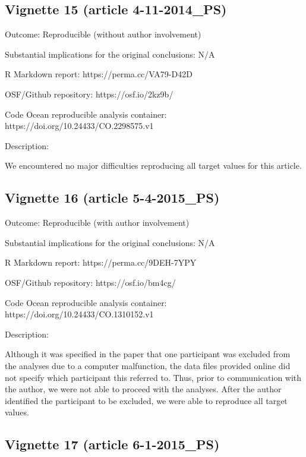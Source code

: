 \begin{appendix}
\hypertarget{vignette-15-article-4-11-2014_ps}{%
\subsection{Vignette 15 (article
4-11-2014\_PS)}\label{vignette-15-article-4-11-2014_ps}}

Outcome: Reproducible (without author involvement)

Substantial implications for the original conclusions: N/A

R Markdown report: https://perma.cc/VA79-D42D

OSF/Github repository: https://osf.io/2kz9b/

Code Ocean reproducible analysis container:
https://doi.org/10.24433/CO.2298575.v1

Description:

We encountered no major difficulties reproducing all target values for
this article.

\hypertarget{vignette-16-article-5-4-2015_ps}{%
\subsection{Vignette 16 (article
5-4-2015\_PS)}\label{vignette-16-article-5-4-2015_ps}}

Outcome: Reproducible (with author involvement)

Substantial implications for the original conclusions: N/A

R Markdown report: https://perma.cc/9DEH-7YPY

OSF/Github repository: https://osf.io/bm4cg/

Code Ocean reproducible analysis container:
https://doi.org/10.24433/CO.1310152.v1

Description:

Although it was specified in the paper that one participant was excluded
from the analyses due to a computer malfunction, the data files provided
online did not specify which participant this referred to. Thus, prior
to communication with the author, we were not able to proceed with the
analyses. After the author identified the participant to be excluded, we
were able to reproduce all target values.

\hypertarget{vignette-17-article-6-1-2015_ps}{%
\subsection{Vignette 17 (article
6-1-2015\_PS)}\label{vignette-17-article-6-1-2015_ps}}


\end{appendix}
